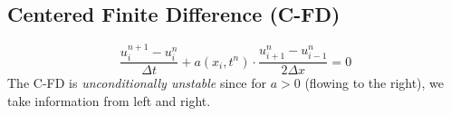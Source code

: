 \subsection{Centered Finite Difference (C-FD)}
\vspace{-0.5em}
    $$
        \frac{u_i^{n+1}-u_i^n}{\Delta t} + a(x_i,t^n) \cdot \frac{u_{i+1}^n-u_{i-1}^n}{2 \Delta x} = 0
    $$
    The C-FD is \textit{unconditionally unstable} since for $a>0$ (flowing to the right), we take information from left and right.